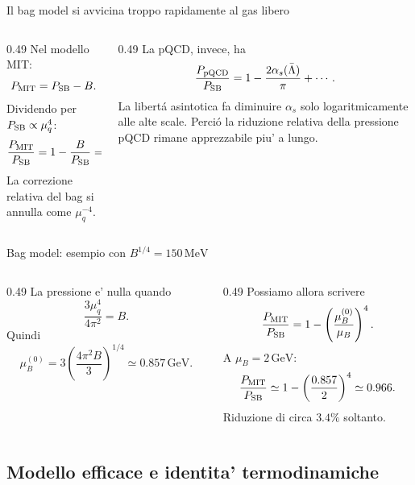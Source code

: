 \begin{frame}{Il bag model si avvicina troppo rapidamente al gas libero}
\small
\begin{columns}[T,onlytextwidth]
\begin{column}{0.49\textwidth}
Nel modello MIT:
\[
P_{\rm MIT}=P_{\rm SB}-B.
\]
Dividendo per $P_{\rm SB}\propto\mu_q^4$:
\[
\frac{P_{\rm MIT}}{P_{\rm SB}}
=1-\frac{B}{P_{\rm SB}}
=1-O(\mu_q^{-4}).
\]
La correzione relativa del bag
si annulla come $\mu_q^{-4}$.
\end{column}
\begin{column}{0.49\textwidth}
La pQCD, invece, ha
\[
\frac{P_{\rm pQCD}}{P_{\rm SB}}
=1-\frac{2\alpha_s(\bar\Lambda)}{\pi}+\cdots.
\]
La libert\'a asintotica fa diminuire
$\alpha_s$ solo logaritmicamente
alle alte scale.
\medskip
Perci\'o la riduzione relativa della pressione
pQCD rimane apprezzabile piu' a lungo.
\end{column}
\end{columns}
\end{frame}

\begin{frame}{Bag model: esempio con $B^{1/4}=150\,\mathrm{MeV}$}
\small
\begin{columns}[T,onlytextwidth]
\begin{column}{0.49\textwidth}
La pressione e' nulla quando
\[
\frac{3\mu_q^4}{4\pi^2}=B.
\]
Quindi
\[
\mu_B^{(0)}
=3\left(\frac{4\pi^2B}{3}\right)^{1/4}
\simeq0.857\,\mathrm{GeV}.
\]
\end{column}
\begin{column}{0.49\textwidth}
Possiamo allora scrivere
\[
\frac{P_{\rm MIT}}{P_{\rm SB}}
=1-\left(\frac{\mu_B^{(0)}}{\mu_B}\right)^4.
\]
A $\mu_B=2\,\mathrm{GeV}$:
\[
\frac{P_{\rm MIT}}{P_{\rm SB}}
\simeq1-\left(\frac{0.857}{2}\right)^4
\simeq0.966.
\]
Riduzione di circa $3.4\%$ soltanto.
\end{column}
\end{columns}
\end{frame}

\subsection{Modello efficace e identita' termodinamiche}


